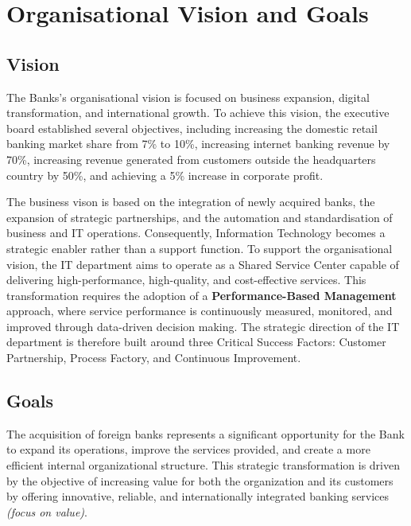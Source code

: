 \chapter{Organisational Vision and Goals}
\label{cap:visiongoals}

\section{Vision}
The Banks's organisational vision is focused on business expansion, digital transformation, and international growth. To achieve this vision, the executive board established several objectives, including increasing the domestic retail banking market share from 7\% to 10\%, increasing internet banking revenue by 70\%, increasing revenue generated from customers outside the headquarters country by 50\%, and achieving a 5\% increase in corporate profit. 

The business vison is based on the integration of newly acquired banks, the expansion of strategic partnerships, and the automation and standardisation of business and IT operations. Consequently, Information Technology becomes a strategic enabler rather than a support function. To support the organisational vision, the IT department aims to operate as a Shared Service Center capable of delivering high-performance, high-quality, and cost-effective services. This transformation requires the adoption of a \textbf{Performance-Based Management} approach, where service performance is continuously measured, monitored, and improved through data-driven decision making. The strategic direction of the IT department is therefore built around three Critical Success Factors: Customer Partnership, Process Factory, and Continuous Improvement.



\section{Goals}



The acquisition of foreign banks represents a significant opportunity for the Bank to expand its operations, improve the services provided, and create a more efficient internal organizational structure. This strategic transformation is driven by the objective of increasing value for both the organization and its customers by offering innovative, reliable, and internationally integrated banking services \textit{(focus on value)}.

